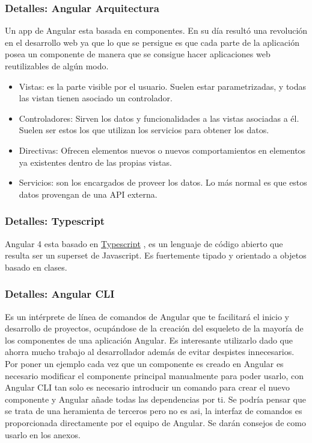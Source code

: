  

\subsubsection{Detalles: Angular Arquitectura}\label{detalle_angulararquitectura}
Un app de Angular esta basada en componentes. En su día resultó una revolución en el desarrollo web ya que lo que se persigue es que cada parte de la aplicación posea un componente de manera que se consigue hacer aplicaciones web reutilizables de algún modo.



\begin{itemize}
\tightlist
\item
Vistas: es la parte visible por el usuario. Suelen estar parametrizadas, y todas
las vistan tienen asociado un controlador.
\item
 Controladores: Sirven los datos y funcionalidades a las vistas asociadas a él. Suelen ser estos los que utilizan los servicios para obtener los datos.
\item
 Directivas: Ofrecen elementos nuevos o nuevos comportamientos en elementos ya existentes dentro de las propias vistas.
  \item
  Servicios: son los encargados de proveer los datos. Lo más normal es que estos datos provengan de una API externa.
\end{itemize}


\subsubsection{Detalles: Typescript}\label{detalle_typescript}
Angular 4 esta basado en  \hyperlink{https://es.wikipedia.org/wiki/TypeScript}{Typescript} , es un lenguaje de código abierto que resulta ser un superset de Javascript. Es fuertemente tipado y orientado a objetos basado en clases.


\subsubsection{Detalles: Angular CLI}\label{detalle_angularcli}
Es un intérprete de línea de comandos de Angular que te facilitará el inicio y desarrollo de proyectos, ocupándose de la creación del esqueleto de la mayoría de los componentes de una aplicación Angular. Es interesante utilizarlo dado que ahorra mucho trabajo al desarrollador además de evitar despistes innecesarios. Por poner un ejemplo cada vez que un componente es creado en Angular es necesario modificar el componente principal manualmente para poder usarlo, con Angular CLI tan solo es necesario introducir un comando para crear el nuevo componente y Angular añade todas las dependencias por ti. Se podría pensar que se trata de una heramienta de terceros pero no es asi, la interfaz de comandos es proporcionada directamente por el equipo de Angular. Se darán consejos de como usarlo en los anexos.


